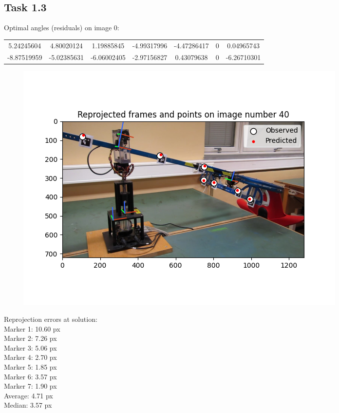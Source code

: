 \documentclass[a4paper]{article} %
\begin{document}
    \subsection*{Task 1.3}
    Optimal angles (residuals) on image 0:
    \begin{center}
        \begin{tabular}{ccccccc}
            5.24245604 & 4.80020124 & 1.19885845 & -4.99317996 & -4.47286417 & 0 & 0.04965743 \\
            -8.87519959 & -5.02385631 & -6.06002405 & -2.97156827 & 0.43079638 & 0 & -6.26710301
        \end{tabular}
    \end{center}
    \begin{figure}[h]
        \centering
        \includegraphics[width= 0.7 \linewidth]{../python/out_part1a_10steps}
    \end{figure}
    Reprojection errors at solution:\\
    Marker 1: 10.60 px\\
    Marker 2:  7.26 px\\
    Marker 3:  5.06 px\\
    Marker 4:  2.70 px\\
    Marker 5:  1.85 px\\
    Marker 6:  3.57 px\\
    Marker 7:  1.90 px\\
    Average:   4.71 px\\
    Median:    3.57 px
\end{document}
